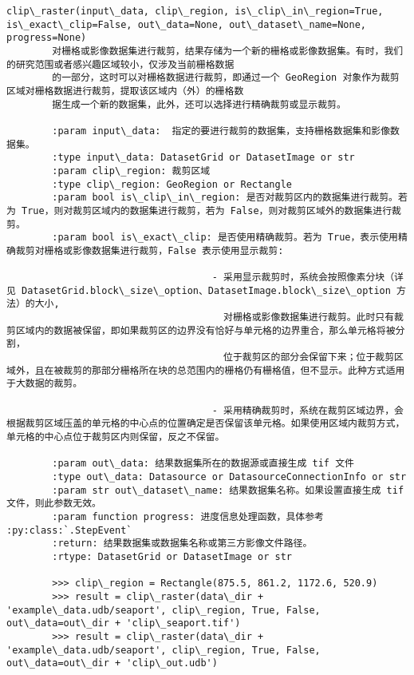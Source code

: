 \documentclass[11pt]{article}
\begin{document}
\begin{Verbatim}[commandchars=\\\{\}]
    clip\_raster(input\_data, clip\_region, is\_clip\_in\_region=True, is\_exact\_clip=False, out\_data=None, out\_dataset\_name=None, progress=None)
        对栅格或影像数据集进行裁剪，结果存储为一个新的栅格或影像数据集。有时，我们的研究范围或者感兴趣区域较小，仅涉及当前栅格数据
        的一部分，这时可以对栅格数据进行裁剪，即通过一个 GeoRegion 对象作为裁剪区域对栅格数据进行裁剪，提取该区域内（外）的栅格数
        据生成一个新的数据集，此外，还可以选择进行精确裁剪或显示裁剪。
        
        :param input\_data:  指定的要进行裁剪的数据集，支持栅格数据集和影像数据集。
        :type input\_data: DatasetGrid or DatasetImage or str
        :param clip\_region: 裁剪区域
        :type clip\_region: GeoRegion or Rectangle
        :param bool is\_clip\_in\_region: 是否对裁剪区内的数据集进行裁剪。若为 True，则对裁剪区域内的数据集进行裁剪，若为 False，则对裁剪区域外的数据集进行裁剪。
        :param bool is\_exact\_clip: 是否使用精确裁剪。若为 True，表示使用精确裁剪对栅格或影像数据集进行裁剪，False 表示使用显示裁剪:
        
                                    - 采用显示裁剪时，系统会按照像素分块（详见 DatasetGrid.block\_size\_option、DatasetImage.block\_size\_option 方法）的大小,
                                      对栅格或影像数据集进行裁剪。此时只有裁剪区域内的数据被保留，即如果裁剪区的边界没有恰好与单元格的边界重合，那么单元格将被分割，
                                      位于裁剪区的部分会保留下来；位于裁剪区域外，且在被裁剪的那部分栅格所在块的总范围内的栅格仍有栅格值，但不显示。此种方式适用于大数据的裁剪。
        
                                    - 采用精确裁剪时，系统在裁剪区域边界，会根据裁剪区域压盖的单元格的中心点的位置确定是否保留该单元格。如果使用区域内裁剪方式，单元格的中心点位于裁剪区内则保留，反之不保留。
        
        :param out\_data: 结果数据集所在的数据源或直接生成 tif 文件
        :type out\_data: Datasource or DatasourceConnectionInfo or str
        :param str out\_dataset\_name: 结果数据集名称。如果设置直接生成 tif 文件，则此参数无效。
        :param function progress: 进度信息处理函数，具体参考 :py:class:`.StepEvent`
        :return: 结果数据集或数据集名称或第三方影像文件路径。
        :rtype: DatasetGrid or DatasetImage or str
        
        >>> clip\_region = Rectangle(875.5, 861.2, 1172.6, 520.9)
        >>> result = clip\_raster(data\_dir + 'example\_data.udb/seaport', clip\_region, True, False, out\_data=out\_dir + 'clip\_seaport.tif')
        >>> result = clip\_raster(data\_dir + 'example\_data.udb/seaport', clip\_region, True, False, out\_data=out\_dir + 'clip\_out.udb')
    

\end{Verbatim}
\end{document}
